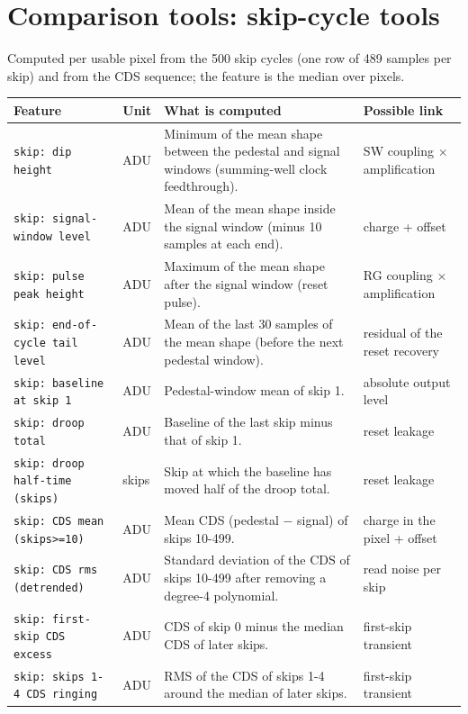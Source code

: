 \documentclass[10pt]{article}
\begin{document}
\section{Comparison tools: skip-cycle tools}
Computed per usable pixel from the 500 skip cycles (one row of 489 samples per skip) and from the CDS sequence; the feature is the median over pixels.

\begin{longtable}{>{\raggedright\arraybackslash}p{}>{\raggedright\arraybackslash}p{}>{\raggedright\arraybackslash}p{}>{\raggedright\arraybackslash}p{}}
\toprule Feature & Unit & What is computed & Possible link \\ \midrule \endhead
\bottomrule \endfoot
\texttt{skip: dip height} & ADU & Minimum of the mean shape between the pedestal and signal windows (summing-well clock feedthrough). & SW coupling $\times$ amplification \\
\texttt{skip: signal-window level} & ADU & Mean of the mean shape inside the signal window (minus 10 samples at each end). & charge + offset \\
\texttt{skip: pulse peak height} & ADU & Maximum of the mean shape after the signal window (reset pulse). & RG coupling $\times$ amplification \\
\texttt{skip: end-of-cycle tail level} & ADU & Mean of the last 30 samples of the mean shape (before the next pedestal window). & residual of the reset recovery \\
\texttt{skip: baseline at skip 1} & ADU & Pedestal-window mean of skip 1. & absolute output level \\
\texttt{skip: droop total} & ADU & Baseline of the last skip minus that of skip 1. & reset leakage \\
\texttt{skip: droop half-time (skips)} & skips & Skip at which the baseline has moved half of the droop total. & reset leakage \\
\texttt{skip: CDS mean (skips\textgreater{}=10)} & ADU & Mean CDS (pedestal $-$ signal) of skips 10-499. & charge in the pixel + offset \\
\texttt{skip: CDS rms (detrended)} & ADU & Standard deviation of the CDS of skips 10-499 after removing a degree-4 polynomial. & read noise per skip \\
\texttt{skip: first-skip CDS excess} & ADU & CDS of skip 0 minus the median CDS of later skips. & first-skip transient \\
\texttt{skip: skips 1-4 CDS ringing} & ADU & RMS of the CDS of skips 1-4 around the median of later skips. & first-skip transient \\

\end{longtable}
\end{document}
